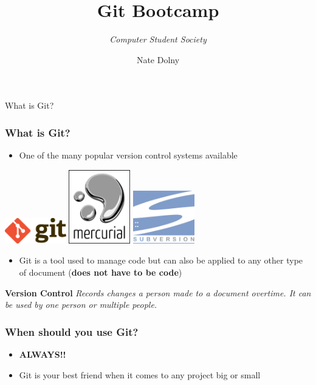 \documentclass{beamer}
\title{\textbf{Git Bootcamp}}
\subtitle{\textit{Computer Student Society}}
\author{Nate Dolny}
\date{}
\begin{document}
\begin{frame}
	\titlepage
\end{frame}

\begin{frame}{What is Git?}
	\frametitle{\textbf{What is Git?}}
	\begin{itemize}
		\item One of the many popular version control systems available
	\end{itemize}

	\begin{center}
		\includegraphics[width=0.2\textwidth]{img/Git-Logo.png} 
		\hspace{1cm}
		\includegraphics[width=0.2\textwidth]{img/Mercurial_logo.png} 
		\hspace{1cm}
		\includegraphics[width=0.2\textwidth]{img/Apache_Subversion_logo.png} 
		\hspace{1cm}
	\end{center}	

	\begin{itemize}
		\item Git is a tool used to manage code but can also be applied to any other 
type of document (\textbf{does not have to be code})
	\end{itemize}
	
	\begin{block}{\textbf{Version Control}}
		\textit{Records changes a person made to a document overtime. It can be used 
by one person or multiple people.}
	\end{block}
\end{frame}

\begin{frame} 
	\frametitle{\textbf{When should you use Git?}}
	\begin{itemize}
		\item \textbf{ALWAYS!!}
		\item Git is your best friend when it comes to any project big or small  
	\end{itemize}
\end{frame}
\end{document}
